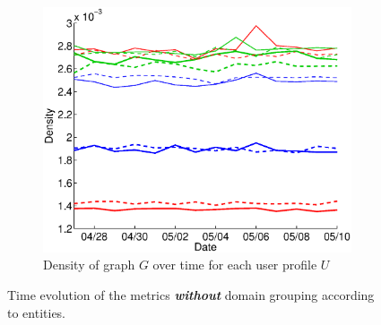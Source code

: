 \documentclass{sig-alternate}
\begin{document}
\begin{figure}
  \begin{subfigure}{.45\textwidth}
    \includegraphics[width=\textwidth]{figures/plots/density.eps}
    \caption{Density of graph $G$ over time for each user profile $U$}
    \label{fig:density}
  \end{subfigure}
  
  \caption{Time evolution of the metrics \textbf{\textit{without}} domain grouping according to entities.}
  \label{fig:metrics_without_entities}
  \end{figure}
  
  
  
\end{document}
